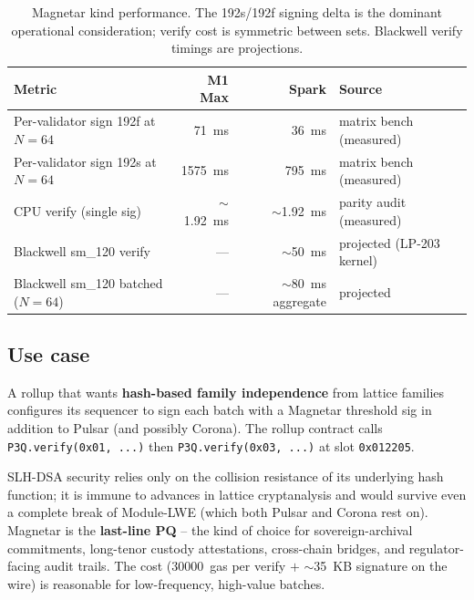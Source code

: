 \begin{table}[h]
\centering
\small
\begin{tabular}{@{}lrrl@{}}
\toprule
\textbf{Metric} & \textbf{M1 Max} & \textbf{Spark} & \textbf{Source} \\
\midrule
Per-validator sign 192f at $N{=}64$ & \SI{71}{\milli\second} & \SI{36}{\milli\second} & matrix bench (measured)~\cite{parityaudit} \\
Per-validator sign 192s at $N{=}64$ & \SI{1575}{\milli\second} & \SI{795}{\milli\second} & matrix bench (measured) \\
CPU verify (single sig) & $\sim$\SI{1.92}{\milli\second} & $\sim$\SI{1.92}{\milli\second} & parity audit (measured) \\
Blackwell sm\_120 verify & --- & $\sim$\SI{50}{\milli\second} & projected (LP-203 kernel)~\cite{lp203} \\
Blackwell sm\_120 batched ($N{=}64$) & --- & $\sim$\SI{80}{\milli\second} aggregate & projected \\
\bottomrule
\end{tabular}
\caption{Magnetar kind performance. The 192s/192f signing
delta is the dominant operational consideration; verify cost is
symmetric between sets. Blackwell verify timings are
projections.}
\label{tab:magnetar-perf}
\end{table}

\subsection{Use case}

A rollup that wants \textbf{hash-based family independence}
from lattice families configures its sequencer to sign each
batch with a Magnetar threshold sig in addition to Pulsar (and
possibly Corona). The rollup contract calls
\texttt{P3Q.verify(0x01, ...)} then \texttt{P3Q.verify(0x03, ...)}
at slot \texttt{0x012205}.

SLH-DSA security relies only on the collision resistance of its
underlying hash function; it is immune to advances in lattice
cryptanalysis and would survive even a complete break of
Module-LWE (which both Pulsar and Corona rest on). Magnetar is the \textbf{last-line PQ}
-- the kind of choice for sovereign-archival commitments,
long-tenor custody attestations, cross-chain bridges, and
regulator-facing audit trails. The cost (\SI{30000}{gas} per
verify $+$ $\sim$\SI{35}{KB} signature on the wire) is
reasonable for low-frequency, high-value batches.
